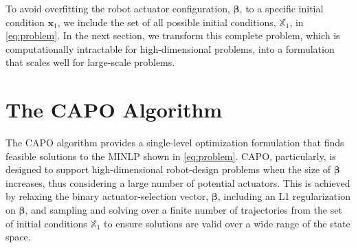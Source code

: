 \documentclass[runningheads]{llncs}
\begin{document}
To avoid overfitting the robot actuator configuration, $\boldsymbol{\beta}$, to a specific initial condition $\textbf{x}_1$, we include the set of all possible initial conditions, $\mathbb{X}_1$, in \eqref{eq:problem}. In the next section, we transform this complete problem, which is computationally intractable for high-dimensional problems, into a formulation that scales well for large-scale problems.
\section{The CAPO Algorithm}\label{sec:Capo_alg}
The CAPO algorithm provides a single-level optimization formulation that finds feasible solutions to the MINLP shown in \eqref{eq:problem}. CAPO, particularly, is designed to support high-dimensional robot-design problems when the size of $\boldsymbol{\beta}$ increases, thus considering a large number of potential actuators. This is achieved by relaxing the binary actuator-selection vector, $\boldsymbol{\beta}$, including an L1 regularization on $\boldsymbol{\beta}$, and sampling and solving over a finite number of trajectories from the set of initial conditions $\mathbb{X}_1$ to ensure solutions are valid over a wide range of the state space.

\vspace{-15pt}
\end{document}
